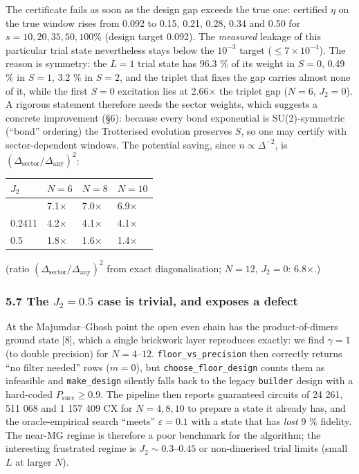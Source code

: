 \documentclass[
]{article}
\begin{document}
The certificate fails as soon as the design gap exceeds the true one:
certified \(\eta\) on the true window rises from 0.092 to 0.15, 0.21,
0.28, 0.34 and 0.50 for \(s=10,20,35,50,100\%\) (design target 0.092).
The \emph{measured} leakage of this particular trial state nevertheless
stays below the \(10^{-3}\) target (\(\le7\times10^{-4}\)). The reason
is symmetry: the \(L=1\) trial state has 96.3 \% of its weight in
\(S=0\), 0.49 \% in \(S=1\), 3.2 \% in \(S=2\), and the triplet that
fixes the gap carries almost none of it, while the first \(S=0\)
excitation lies at 2.66× the triplet gap (\(N=6\), \(J_2=0\)). A
rigorous statement therefore needs the sector weights, which suggests a
concrete improvement (§6): because every bond exponential is
SU(2)-symmetric (``bond'' ordering) the Trotterised evolution preserves
\(S\), so one may certify with sector-dependent windows. The potential
saving, since \(n\propto\Delta^{-2}\), is
\((\Delta_{\mathrm{sector}}/\Delta_{\mathrm{any}})^2\):

\begin{longtable}[]{@{}llll@{}}
\toprule\noalign{}
\(J_2\) & \(N=6\) & \(N=8\) & \(N=10\) \\
\midrule\noalign{}
\endhead
\bottomrule\noalign{}
\endlastfoot
0 & 7.1× & 7.0× & 6.9× \\
0.2411 & 4.2× & 4.1× & 4.1× \\
0.5 & 1.8× & 1.6× & 1.4× \\
\end{longtable}

(ratio \((\Delta_{\mathrm{sector}}/\Delta_{\mathrm{any}})^2\) from exact
diagonalisation; \(N=12\), \(J_2=0\): 6.8×.)

\hypertarget{the-j_20.5-case-is-trivial-and-exposes-a-defect}{%
\subsubsection{\texorpdfstring{5.7 The \(J_2=0.5\) case is trivial, and
exposes a
defect}{5.7 The J\_2=0.5 case is trivial, and exposes a defect}}\label{the-j_20.5-case-is-trivial-and-exposes-a-defect}}

At the Majumdar--Ghosh point the open even chain has the
product-of-dimers ground state {[}8{]}, which a single brickwork layer
reproduces exactly: we find \(\gamma=1\) (to double precision) for
\(N=4\)--\(12\). \texttt{floor\_vs\_precision} then correctly returns
``no filter needed'' rows (\(m=0\)), but \texttt{choose\_floor\_design}
counts them as infeasible and \texttt{make\_design} silently falls back
to the legacy \texttt{builder} design with a hard-coded
\(P_{\mathrm{succ}}\ge0.9\). The pipeline then reports guaranteed
circuits of 24 261, 511 068 and 1 157 409 CX for \(N=4,8,10\) to prepare
a state it already has, and the oracle-empirical search ``meets''
\(\varepsilon=0.1\) with a state that has \emph{lost} 9 \% fidelity. The
near-MG regime is therefore a poor benchmark for the algorithm; the
interesting frustrated regime is \(J_2\sim0.3\)--\(0.45\) or
non-dimerised trial limits (small \(L\) at larger \(N\)).
\end{document}
